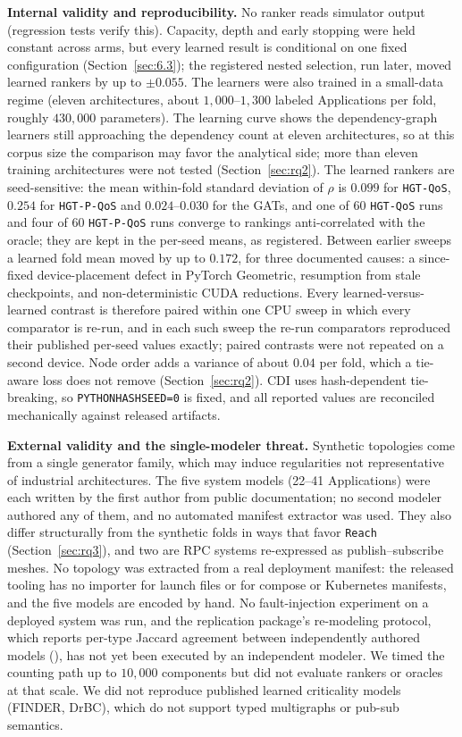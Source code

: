 \noindent\textbf{Internal validity and reproducibility.} No ranker reads simulator output (regression tests verify this). Capacity, depth and early stopping were held constant across arms, but every learned result is conditional on one fixed configuration (Section~\ref{sec:6.3}); the registered nested selection, run later, moved learned rankers by up to $\pm 0.055$. The learners were also trained in a small-data regime (eleven architectures, about $1{,}000$--$1{,}300$ labeled Applications per fold, roughly $430{,}000$ parameters). The learning curve shows the dependency-graph learners still approaching the dependency count at eleven architectures, so at this corpus size the comparison may favor the analytical side; more than eleven training architectures were not tested (Section~\ref{sec:rq2}). The learned rankers are seed-sensitive: the mean within-fold standard deviation of $\rho$ is $0.099$ for \texttt{HGT-QoS}, $0.254$ for \texttt{HGT-P-QoS} and $0.024$--$0.030$ for the GATs, and one of 60 \texttt{HGT-QoS} runs and four of 60 \texttt{HGT-P-QoS} runs converge to rankings anti-correlated with the oracle; they are kept in the per-seed means, as registered. Between earlier sweeps a learned fold mean moved by up to $0.172$, for three documented causes: a since-fixed device-placement defect in PyTorch Geometric, resumption from stale checkpoints, and non-deterministic CUDA reductions. Every learned-versus-learned contrast is therefore paired within one CPU sweep in which every comparator is re-run, and in each such sweep the re-run comparators reproduced their published per-seed values exactly; paired contrasts were not repeated on a second device. Node order adds a variance of about $0.04$ per fold, which a tie-aware loss does not remove (Section~\ref{sec:rq2}). CDI uses hash-dependent tie-breaking, so \texttt{PYTHONHASHSEED=0} is fixed, and all reported values are reconciled mechanically against released artifacts.

\noindent\textbf{External validity and the single-modeler threat.} Synthetic topologies come from a single generator family, which may induce regularities not representative of industrial architectures. The five system models (22--41 Applications) were each written by the first author from public documentation; no second modeler authored any of them, and no automated manifest extractor was used. They also differ structurally from the synthetic folds in ways that favor \texttt{Reach} (Section~\ref{sec:rq3}), and two are RPC systems re-expressed as publish--subscribe meshes. No topology was extracted from a real deployment manifest: the released tooling has no importer for launch files or for compose or Kubernetes manifests, and the five models are encoded by hand. No fault-injection experiment on a deployed system was run, and the replication package's re-modeling protocol, which reports per-type Jaccard agreement between independently authored models (), has not yet been executed by an independent modeler. We timed the counting path up to $10{,}000$ components but did not evaluate rankers or oracles at that scale. We did not reproduce published learned criticality models (FINDER, DrBC), which do not support typed multigraphs or pub-sub semantics.


